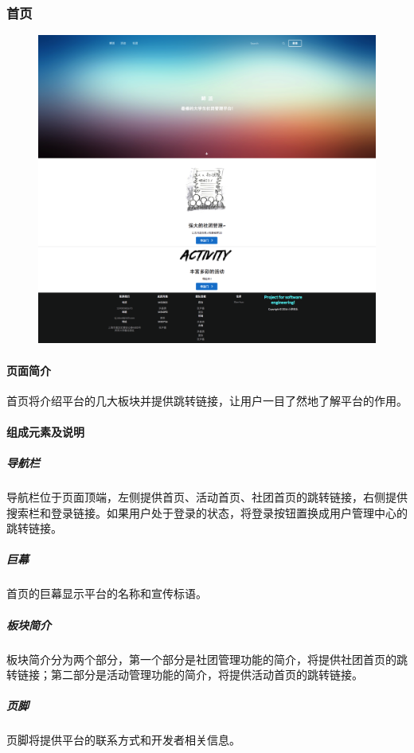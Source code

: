 \documentclass[UTF8]{ctexart}
\begin{document}
\subsubsection{首页}
\begin{figure}[H]
\centering
\includegraphics[width = .9\textwidth]{web-index.png}
\end{figure}
\paragraph{页面简介}
首页将介绍平台的几大板块并提供跳转链接，让用户一目了然地了解平台的作用。

\paragraph{组成元素及说明}
\subparagraph*{导航栏}
导航栏位于页面顶端，左侧提供首页、活动首页、社团首页的跳转链接，右侧提供搜索栏和登录链接。如果用户处于登录的状态，将登录按钮置换成用户管理中心的跳转链接。
\subparagraph*{巨幕}
首页的巨幕显示平台的名称和宣传标语。
\subparagraph*{板块简介}
板块简介分为两个部分，第一个部分是社团管理功能的简介，将提供社团首页的跳转链接；第二部分是活动管理功能的简介，将提供活动首页的跳转链接。
\subparagraph*{页脚}
页脚将提供平台的联系方式和开发者相关信息。
\end{document}
